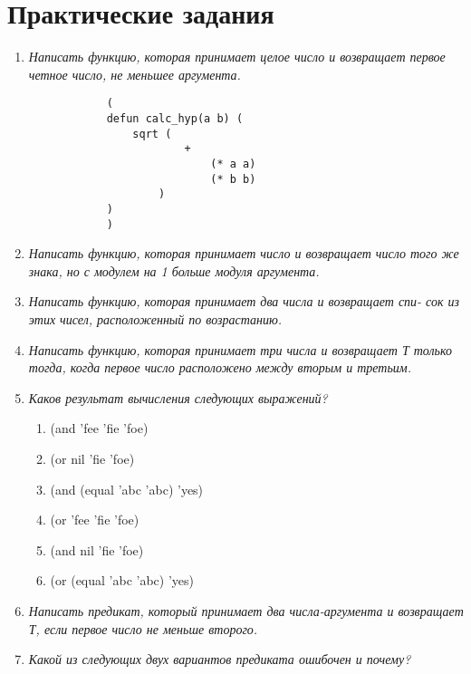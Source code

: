\chapter{Практические задания}

\begin{enumerate}[wide=0pt]

	\item \textit{Написать функцию, которая принимает целое число и возвращает первое
	четное число, не меньшее аргумента.}

		\begin{lstlisting}
			(
			defun calc_hyp(a b) (
				sqrt (
						+ 
							(* a a)
							(* b b) 
					)
			)
			)

		\end{lstlisting}


	\item  \textit{Написать функцию, которая принимает число и возвращает число
	того же знака, но с модулем на 1 больше модуля аргумента.}

	\item  \textit{Написать функцию, которая принимает два числа и возвращает спи-
	сок из этих чисел, расположенный по возрастанию.}

	\item  \textit{Написать функцию, которая принимает три числа и возвращает Т
	только тогда, когда первое число расположено между вторым и третьим.}

	\item  \textit{Каков результат вычисления следующих выражений?}
	
		\begin{enumerate}[label=\arabic*)]
			\item (and 'fee 'fie 'foe)
			\item (or nil 'fie 'foe)
			\item (and (equal 'abc 'abc) 'yes)
			\item (or 'fee 'fie 'foe)
			\item (and nil 'fie 'foe)
			\item (or (equal 'abc 'abc) 'yes)
		\end{enumerate}

	\item  \textit{Написать предикат, который принимает два числа-аргумента и 
	возвращает Т, если первое число не меньше второго.}

	\item  \textit{Какой из следующих двух вариантов предиката ошибочен и почему?}
	

\end{enumerate}
